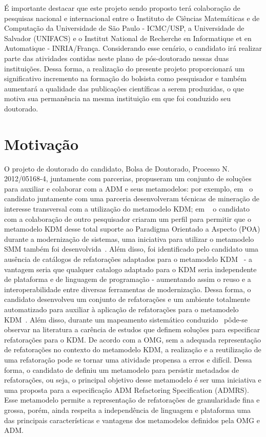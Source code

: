\documentclass[12pt]{article}
\begin{document}
É importante destacar que este projeto sendo proposto terá colaboração de pesquisas nacional e internacional entre o Instituto de Ciências Matemáticas e de Computação da Universidade de São Paulo - ICMC/USP, a Universidade de Salvador (UNIFACS) e o Institut National de Recherche en Informatique et en Automatique - INRIA/França. Considerando esse cenário, o candidato irá realizar parte das atividades contidas neste plano de pós-doutorado nessas duas instituições. Dessa forma, a realização do presente projeto proporcionará um significativo incremento na formação do bolsista como pesquisador e também aumentará a qualidade das publicações científicas a serem produzidas, o que motiva sua permanência na mesma instituição em que foi conduzido seu doutorado.


\section{Motivação}

O projeto de doutorado do candidato, Bolsa de Doutorado, Processo N. 2012/05168-4, juntamente com parcerias, propuseram um conjunto de soluções para auxiliar e colaborar com a ADM e seus metamodelos: por exemplo, em~\cite{dani_san_tool, dani_san, daniel_san_journal} o candidato juntamente com uma parceria desenvolveram técnicas de mineração de interesse transversal com a utilização do metamodelo KDM; em ~\cite{Santos_2014, santo_wmod} o candidato com a colaboração de outro pesquisador criaram um perfil para permitir que o metamodelo KDM desse total suporte ao Paradigma Orientado a Aspecto (POA) durante a modernização de sistemas, uma iniciativa para utilizar o metamodelo SMM também foi desenvolvida~\cite{honda_dissertacao}. Além disso, foi identificado pelo candidato uma ausência de catálogos de refatorações adaptados para o metamodelo KDM~\cite{durelli_systematic_mapping} - a vantagem seria que qualquer catalogo adaptado para o KDM seria independente de plataforma e de linguagem de programação - aumentando assim o reuso e a interoperabilidade entre diversas ferramentas de modernização. Dessa forma, o candidato desenvolveu um conjunto de refatorações e um ambiente totalmente automatizado para auxiliar à aplicação de refatorações para o metamodelo KDM~\cite{durelli_catalogo, durelli_VEM_ferramenta}. Além disso, durante um mapeamento sistemático conduzido~\cite{durelli_systematic_mapping} pôde-se observar na literatura a carência de estudos que definem soluções para especificar refatorações para o KDM. De acordo com a OMG, sem a adequada representação de refatorações no contexto do metamodelo KDM, a realização e a reutilização de uma refatoração pode se tornar uma atividade propensa a erros e difícil. Dessa forma, o candidato de definiu um metamodelo para persistir metadados de refatorações, ou seja, o principal objetivo desse metamodelo é ser uma iniciativa e uma proposta para a especificação ADM Refactoring Specification (ADMRS). Esse metamodelo permite a representação de refatorações de granularidade fina e grossa, porém, ainda respeita a independência de linguagem e plataforma uma das principais características e vantagens dos metamodelos definidos pela OMG e ADM. 
\end{document}
